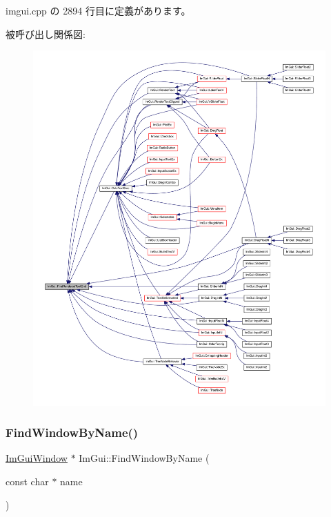  imgui.\+cpp の 2894 行目に定義があります。

被呼び出し関係図\+:\nopagebreak
\begin{figure}[H]
\begin{center}
\leavevmode
\includegraphics[width=350pt]{namespace_im_gui_a7671e1dbc803a31b06081b52a771d83f_icgraph}
\end{center}
\end{figure}
\mbox{\label{namespace_im_gui_abca25f22c02e73d5eb2e9c72c4557813}} 
\subsubsection{\texorpdfstring{Find\+Window\+By\+Name()}{FindWindowByName()}}
{\footnotesize\ttfamily \mbox{\hyperlink{struct_im_gui_window}{Im\+Gui\+Window}} $\ast$ Im\+Gui\+::\+Find\+Window\+By\+Name (\begin{DoxyParamCaption}\item[{const char $\ast$}]{name }\end{DoxyParamCaption})}



